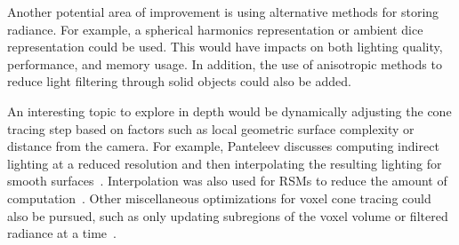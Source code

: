 Another potential area of improvement is using alternative methods for storing radiance. For example, a spherical harmonics representation or ambient dice~\cite{iwanicki2017ambient} representation could be used. This would have impacts on both lighting quality, performance, and memory usage. In addition, the use of anisotropic methods to reduce light filtering through solid objects could also be added.

An interesting topic to explore in depth would be dynamically adjusting the cone tracing step based on factors such as local geometric surface complexity or distance from the camera. For example, Panteleev discusses computing indirect lighting at a reduced resolution and then interpolating the resulting lighting for smooth surfaces~\cite{practicalvxgi}. Interpolation was also used for RSMs to reduce the amount of computation~\cite{Dachsbacher:2005:RSM:1053427.1053460}. Other miscellaneous optimizations for voxel cone tracing could also be pursued, such as only updating subregions of the voxel volume or filtered radiance at a time~\cite{mclaren2016cascaded}.
